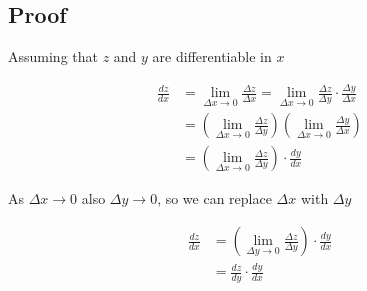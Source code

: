 \documentclass{article}
\begin{document}
\subsection{Proof}

Assuming that \(z\) and \(y\) are differentiable in \(x\)

\begin{align*}
    \frac{dz}{dx}
    &= \lim_{\Delta x \to 0} \frac{\Delta z}{\Delta x}
    = \lim_{\Delta x \to 0} \frac{\Delta z}{\Delta y} \cdot \frac{\Delta y}{\Delta x} \\
    &= \left(
        \lim_{\Delta x \to 0} \frac{\Delta z}{\Delta y}
    \right)
    \left(
        \lim_{\Delta x \to 0} \frac{\Delta y}{\Delta x}
    \right) \\
    &= \left(
        \lim_{\Delta x \to 0} \frac{\Delta z}{\Delta y}
    \right)
    \cdot
    \frac{dy}{dx}
\end{align*}

As \(\Delta x \to 0\) also \(\Delta y \to 0\), so we can replace \(\Delta x\) with \(\Delta y\)

\begin{align*}
    \frac{dz}{dx}
    &= \left(
        \lim_{\Delta y \to 0} \frac{\Delta z}{\Delta y}
    \right)
    \cdot
    \frac{dy}{dx} \\
    &= \frac{dz}{dy} \cdot \frac{dy}{dx}
\end{align*}
\end{document}
